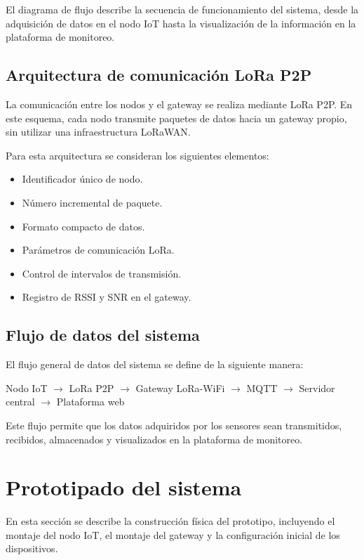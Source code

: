 El diagrama de flujo describe la secuencia de funcionamiento del sistema, desde la adquisición de datos en el nodo IoT hasta la visualización de la información en la plataforma de monitoreo.

\subsection{Arquitectura de comunicación LoRa P2P}

La comunicación entre los nodos y el gateway se realiza mediante LoRa P2P. En este esquema, cada nodo transmite paquetes de datos hacia un gateway propio, sin utilizar una infraestructura LoRaWAN.

Para esta arquitectura se consideran los siguientes elementos:

\begin{itemize}
    \item Identificador único de nodo.
    \item Número incremental de paquete.
    \item Formato compacto de datos.
    \item Parámetros de comunicación LoRa.
    \item Control de intervalos de transmisión.
    \item Registro de RSSI y SNR en el gateway.
\end{itemize}

\subsection{Flujo de datos del sistema}

El flujo general de datos del sistema se define de la siguiente manera:

\begin{center}
Nodo IoT $\rightarrow$ LoRa P2P $\rightarrow$ Gateway LoRa-WiFi $\rightarrow$ MQTT $\rightarrow$ Servidor central $\rightarrow$ Plataforma web
\end{center}

Este flujo permite que los datos adquiridos por los sensores sean transmitidos, recibidos, almacenados y visualizados en la plataforma de monitoreo.

\section{Prototipado del sistema}

En esta sección se describe la construcción física del prototipo, incluyendo el montaje del nodo IoT, el montaje del gateway y la configuración inicial de los dispositivos.


